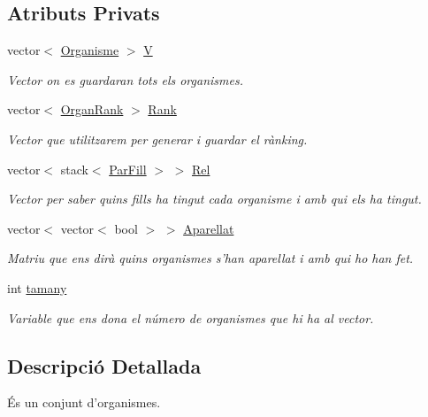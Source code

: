 \subsection*{Atributs Privats}
\begin{DoxyCompactItemize}
\item 
vector$<$ \hyperlink{class_organisme}{Organisme} $>$ \hyperlink{class_conjunt_org_adab11e0ac8295072ec682716478a535a}{V}
\begin{DoxyCompactList}\small\item\em Vector on es guardaran tots els organismes. \end{DoxyCompactList}\item 
vector$<$ \hyperlink{struct_organ_rank}{Organ\-Rank} $>$ \hyperlink{class_conjunt_org_ae566806533e21f56caf27480d342c460}{Rank}
\begin{DoxyCompactList}\small\item\em Vector que utilitzarem per generar i guardar el rànking. \end{DoxyCompactList}\item 
vector$<$ stack$<$ \hyperlink{struct_par_fill}{Par\-Fill} $>$ $>$ \hyperlink{class_conjunt_org_a254051054023bf3ecbbe96c82cfe46a2}{Rel}
\begin{DoxyCompactList}\small\item\em Vector per saber quins fills ha tingut cada organisme i amb qui els ha tingut. \end{DoxyCompactList}\item 
vector$<$ vector$<$ bool $>$ $>$ \hyperlink{class_conjunt_org_a9782fdb4c89e8dd61762453de8f77fcb}{Aparellat}
\begin{DoxyCompactList}\small\item\em Matriu que ens dirà quins organismes s'han aparellat i amb qui ho han fet. \end{DoxyCompactList}\item 
int \hyperlink{class_conjunt_org_a468e7686498561628ad731ea196df8b5}{tamany}
\begin{DoxyCompactList}\small\item\em Variable que ens dona el número de organismes que hi ha al vector. \end{DoxyCompactList}\end{DoxyCompactItemize}


\subsection{Descripció Detallada}
És un conjunt d'organismes. 

